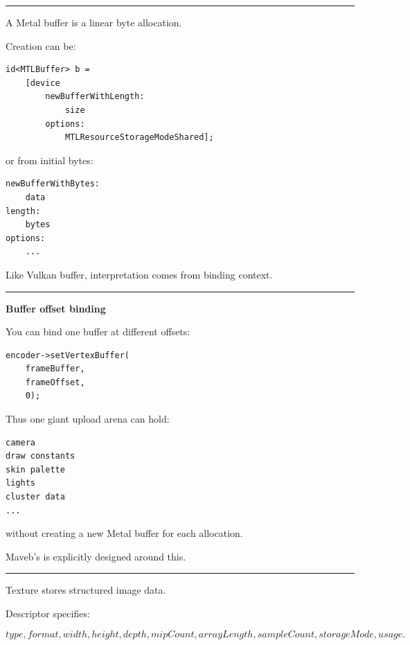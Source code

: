 \begin{center}\rule{0.5\linewidth}{0.5pt}\end{center}

\textbf{}

A Metal buffer is a linear byte allocation.

Creation can be:

\begin{verbatim}
id<MTLBuffer> b =
    [device
        newBufferWithLength:
            size
        options:
            MTLResourceStorageModeShared];
\end{verbatim}

or from initial bytes:

\begin{verbatim}
newBufferWithBytes:
    data
length:
    bytes
options:
    ...
\end{verbatim}

Like Vulkan buffer, interpretation comes from binding context.

\begin{center}\rule{0.5\linewidth}{0.5pt}\end{center}

\textbf{Buffer offset binding}

You can bind one buffer at different offsets:

\begin{verbatim}
encoder->setVertexBuffer(
    frameBuffer,
    frameOffset,
    0);
\end{verbatim}

Thus one giant upload arena can hold:

\begin{verbatim}
camera
draw constants
skin palette
lights
cluster data
...
\end{verbatim}

without creating a new Metal buffer for each allocation.

Maveb's  is explicitly designed around this.

\begin{center}\rule{0.5\linewidth}{0.5pt}\end{center}

\textbf{}

Texture stores structured image data.

Descriptor specifies:

\[
type,
format,
width,
height,
depth,
mipCount,
arrayLength,
sampleCount,
storageMode,
usage.
\]

